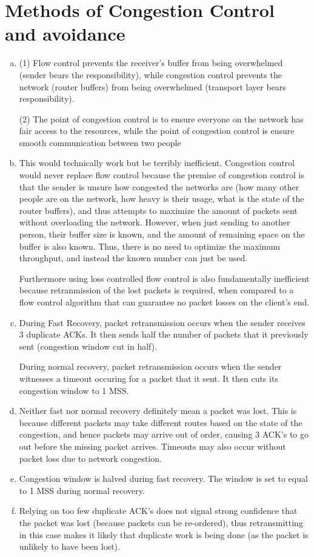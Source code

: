 \documentclass[11pt]{article}
\begin{document}
\section*{Methods of Congestion Control and avoidance}
  \begin{enumerate}[(a)]
    \item
      (1) Flow control prevents the receiver's buffer from being overwhelmed
          (sender bears the responsibility),
          while congestion control prevents the network (router buffers) from
          being overwhelmed (transport layer bears responsibility).

      (2) The point of congestion control is to ensure everyone on the network
          has fair access to the resources, while the point of congestion
          control is ensure smooth communication between two people
    \item
      This would technically work but be terribly inefficient. Congestion control
      would never replace flow control because the premise of congestion control
      is that the sender is unsure how congested the networks are (how many other
      people are on the network, how heavy is their usage, what is the state of
      the router buffers), and thus attempts to maximize the amount of packets
      sent without overloading the network. However, when just sending to another
      person, their buffer size is known, and the amount of remaining space
      on the buffer is also known. Thus, there is no need to optimize the maximum
      throughput, and instead the known number can just be used.

      Furthermore using loss controlled flow control is also fundamentally inefficient
      because retranmission of the lost packets is required, when compared to a flow
      control algorithm that can guarantee no packet losses on the client's end.
    \item
      During Fast Recovery, packet retransmission occurs when the sender receives
      3 duplicate ACKs. It then sends half the number of packets that it previously
      sent (congestion window cut in half).

      During normal recovery, packet
      retransmission occurs when the sender witnesses a timeout occuring for a
      packet that it sent. It then cuts its congestion window to 1 MSS.
    \item
      Neither fast nor normal recovery definitely mean a packet was lost. This is
      because different packets may take different routes based on the state
      of the congestion, and hence packets may arrive out of order, causing 3
      ACK's to go out before the missing packet arrives. Timeouts may also
      occur without packet loss due to network congestion.
    \item
      Congestion window is halved during fast recovery. The window is set to
      equal to 1 MSS during normal recovery.
    \item
      Relying on too few duplicate ACK's does not signal strong confidence that
      the packet was lost (because packets can be re-ordered), thus retransmitting
      in this case makes it likely that duplicate work is being done (as the packet
      is unlikely to have been lost).


\end{enumerate}
\end{document}
